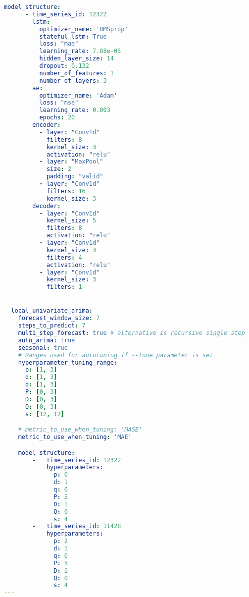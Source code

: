 \begin{lstlisting}[language=yaml]
    model_structure:
      - time_series_id: 12322
        lstm:
          optimizer_name: 'RMSprop'
          stateful_lstm: True
          loss: "mae"
          learning_rate: 7.88e-05
          hidden_layer_size: 14
          dropout: 0.132
          number_of_features: 1
          number_of_layers: 3
        ae:
          optimizer_name: 'Adam'
          loss: "mse"
          learning_rate: 0.003
          epochs: 20
        encoder:
          - layer: "Conv1d"
            filters: 8
            kernel_size: 3
            activation: "relu"
          - layer: "MaxPool"
            size: 2
            padding: "valid"
          - layer: "Conv1d"
            filters: 16
            kernel_size: 3
        decoder:
          - layer: "Conv1d"
            kernel_size: 5
            filters: 8
            activation: "relu"
          - layer: "Conv1d"
            kernel_size: 3
            filters: 4
            activation: "relu"
          - layer: "Conv1d"
            kernel_size: 3
            filters: 1


  local_univariate_arima:
    forecast_window_size: 7
    steps_to_predict: 7
    multi_step_forecast: true # alternative is recursive single step
    auto_arima: true
    seasonal: true
    # Ranges used for autotuning if --tune parameter is set
    hyperparameter_tuning_range:
      p: [1, 3]
      d: [1, 3]
      q: [1, 3]
      P: [0, 3]
      D: [0, 3]
      Q: [0, 3]
      s: [12, 12]

    # metric_to_use_when_tuning: 'MASE'
    metric_to_use_when_tuning: 'MAE'

    model_structure:
        -   time_series_id: 12322
            hyperparameters:
              p: 0
              d: 1
              q: 0
              P: 5
              D: 1
              Q: 0
              s: 4
        -   time_series_id: 11428
            hyperparameters:
              p: 2
              d: 1
              q: 0
              P: 5
              D: 1
              Q: 0
              s: 4
---
\end{lstlisting}